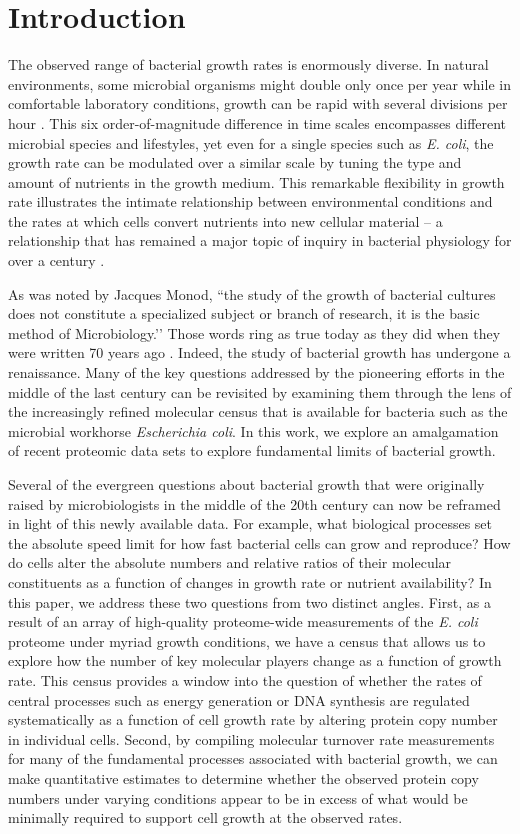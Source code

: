 \section{Introduction}
The observed range of bacterial growth rates is enormously diverse. In
natural environments, some microbial organisms might double only once per
year \citep{mikucki2009} while in comfortable laboratory conditions, growth
can be rapid with several divisions per hour \citep{schaechter1958}. This six
order-of-magnitude difference in time scales encompasses different microbial
species and lifestyles, yet even for a single species such as \textit{E.
coli}, the growth rate can be modulated over a similar scale by tuning the
type and amount of nutrients in the growth medium. This remarkable
flexibility in growth rate illustrates the intimate relationship between
environmental conditions and the rates at which cells convert nutrients into
new cellular material -- a relationship that has remained a major topic of
inquiry in bacterial physiology for over a century \citep{jun2018}. 

As was noted by Jacques Monod, ``the study of the growth of bacterial
cultures does not constitute a specialized subject or branch of research, it
is the basic method of Microbiology.’’ Those words ring as true today as they
did when they were written 70 years ago \citep{monod1949}. Indeed, the study
of bacterial growth has undergone a renaissance. Many of the key questions
addressed by the pioneering efforts in the middle of the last century can be
revisited by examining them through the lens of the increasingly refined
molecular census that is available for bacteria such as the microbial
workhorse \textit{Escherichia coli}. In this work, we explore an amalgamation
of recent proteomic data sets to explore fundamental limits of bacterial growth.

Several of the evergreen questions about bacterial growth that were originally
raised by microbiologists in the middle of the 20th century can now be reframed
in light of this newly available data. For example, what biological
processes set the absolute speed limit for how fast bacterial cells can grow and
reproduce? How do cells alter the absolute numbers and relative ratios of their
molecular constituents as a function of changes in growth rate or nutrient
availability? In this paper, we address these two questions from two distinct
angles. First, as a result of an array of high-quality proteome-wide
measurements of the \textit{E. coli} proteome under myriad growth
conditions, we have a census that allows us to explore how the number of key
molecular players change as a function of growth rate. This census provides a
window into the question of whether the rates of central processes such as
energy generation or DNA synthesis are regulated systematically as a function of
cell growth rate by altering protein copy number in individual cells. Second, by
compiling molecular turnover rate measurements for many of the fundamental
processes associated with bacterial growth, we can make quantitative estimates
to determine whether the observed protein copy numbers under varying conditions
appear to be in excess of what would be minimally required to support cell
growth at the observed rates.

